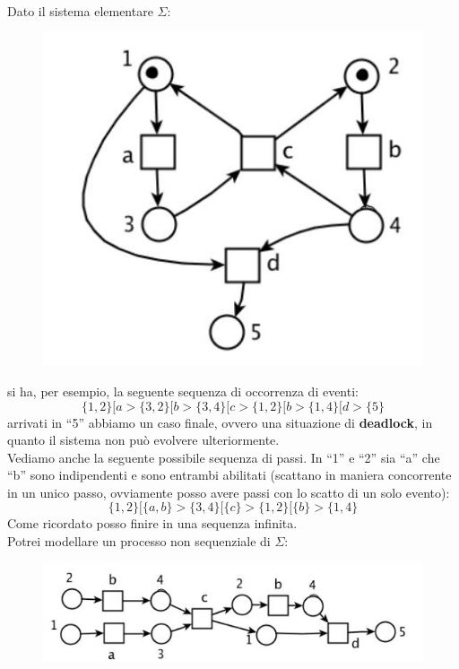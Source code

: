 \newpage
\begin{esempio}
  Dato il sistema elementare $\Sigma$:
  \begin{figure}[H]
    \centering
    \includegraphics[scale = 0.4]{img/seq.jpg}
  \end{figure}
  si ha, per esempio, la seguente sequenza di occorrenza di eventi:
  \[\{1, 2\}[a > \{3, 2\}[b > \{3, 4\}[c > \{1, 2\}[b > \{1, 4\}[d > \{5\}\]
  arrivati in ``5'' abbiamo un caso finale, ovvero una situazione di
  \textbf{deadlock}, in quanto il sistema non può evolvere ulteriormente.\\
  Vediamo anche la seguente possibile sequenza di passi. In ``1'' e ``2'' sia
  ``a'' che ``b'' sono indipendenti e sono entrambi abilitati (scattano in
  maniera concorrente in un unico passo, ovviamente posso avere passi con lo
  scatto di un solo evento):
  \[\{1, 2\}[\{a, b\} > \{3, 4\}[\{c\} > \{1, 2\}[\{b\} > \{1, 4\}\]
  Come ricordato posso finire in una sequenza infinita.\\
  Potrei modellare un processo non sequenziale di $\Sigma$:
  \begin{figure}[H]
    \centering
    \includegraphics[scale = 0.4]{img/seq5.jpg}
  \end{figure}
\end{esempio}
